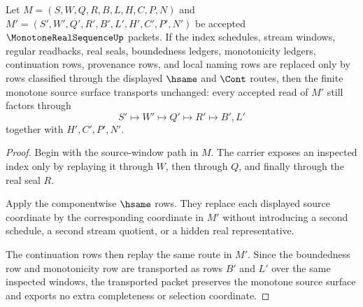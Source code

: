 \begin{theorem}
\label{thm:monotone-real-sequence-window-transport}
Let $M=(S,W,Q,R,B,L,H,C,P,N)$ and $M'=(S',W',Q',R',B',L',H',C',P',N')$ be accepted $\MonotoneRealSequenceUp$ packets. If the index schedules, stream windows, regular readbacks, real seals, boundedness ledgers, monotonicity ledgers, continuation rows, provenance rows, and local naming rows are replaced only by rows classified through the displayed $\hsame$ and $\Cont$ routes, then the finite monotone source surface transports unchanged: every accepted read of $M'$ still factors through
$$
S'\longmapsto W'\longmapsto Q'\longmapsto R'\longmapsto B',L'
$$
together with $H',C',P',N'$.
\end{theorem}
\begin{proof}
Begin with the source-window path in $M$. The carrier exposes an inspected index only by replaying it through $W$, then through $Q$, and finally through the real seal $R$.

Apply the componentwise $\hsame$ rows. They replace each displayed source coordinate by the corresponding coordinate in $M'$ without introducing a second schedule, a second stream quotient, or a hidden real representative.

The continuation rows then replay the same route in $M'$. Since the boundedness row and monotonicity row are transported as rows $B'$ and $L'$ over the same inspected windows, the transported packet preserves the monotone source surface and exports no extra completeness or selection coordinate.
\end{proof}

